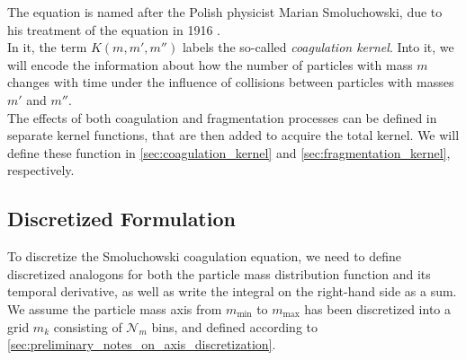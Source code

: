     The equation is named after the Polish physicist Marian Smoluchowski, due to his treatment 
    of the equation in 1916 \cite{smoluchowski_1916}. \\

    In it, the term $K(m, m', m'')$ labels the so-called \textit{coagulation kernel}. 
    Into it, we will encode the information about how the number of particles with mass $m$ 
    changes with time under the influence of collisions between particles with masses 
    $m'$ and $m''$. \\

    The effects of both coagulation and fragmentation processes can be defined in separate 
    kernel functions, that are then added to acquire the total kernel. We will define 
    these function in \cref{sec:coagulation_kernel} and \cref{sec:fragmentation_kernel},
    respectively.




 

    \newpage\subsection{Discretized Formulation}

        To discretize the Smoluchowski coagulation equation, we need to define discretized 
        analogons for both the particle mass distribution function and its temporal derivative, 
        as well as write the integral on the right-hand side as a sum. 
        We assume the particle mass axis from $m_\text{min}$ to $m_\text{max}$ has been
        discretized into a grid $m_k$ consisting of $\mathcal N_m$ bins, and defined 
        according to \cref{sec:preliminary_notes_on_axis_discretization}. \\

